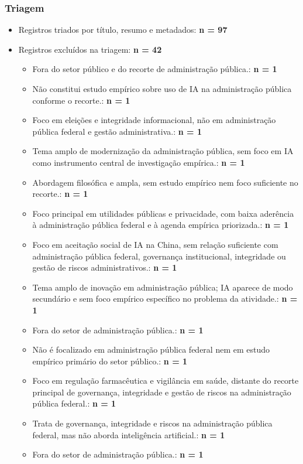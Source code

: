 \documentclass[12pt,a4paper]{article}
\begin{document}
\subsubsection{Triagem}
\label{sec:org6e35005}
\begin{itemize}
\item Registros triados por título, resumo e metadados: \textbf{n = 97}
\item Registros excluídos na triagem: \textbf{n = 42}
\begin{itemize}
\item Fora do setor público e do recorte de administração pública.: \textbf{n = 1}
\item Não constitui estudo empírico sobre uso de IA na administração pública conforme o recorte.: \textbf{n = 1}
\item Foco em eleições e integridade informacional, não em administração pública federal e gestão administrativa.: \textbf{n = 1}
\item Tema amplo de modernização da administração pública, sem foco em IA como instrumento central de investigação empírica.: \textbf{n = 1}
\item Abordagem filosófica e ampla, sem estudo empírico nem foco suficiente no recorte.: \textbf{n = 1}
\item Foco principal em utilidades públicas e privacidade, com baixa aderência à administração pública federal e à agenda empírica priorizada.: \textbf{n = 1}
\item Foco em aceitação social de IA na China, sem relação suficiente com administração pública federal, governança institucional, integridade ou gestão de riscos administrativos.: \textbf{n = 1}
\item Tema amplo de inovação em administração pública; IA aparece de modo secundário e sem foco empírico específico no problema da atividade.: \textbf{n = 1}
\item Fora do setor de administração pública.: \textbf{n = 1}
\item Não é focalizado em administração pública federal nem em estudo empírico primário do setor público.: \textbf{n = 1}
\item Foco em regulação farmacêutica e vigilância em saúde, distante do recorte principal de governança, integridade e gestão de riscos na administração pública federal.: \textbf{n = 1}
\item Trata de governança, integridade e riscos na administração pública federal, mas não aborda inteligência artificial.: \textbf{n = 1}
\item Fora do setor de administração pública.: \textbf{n = 1}

\end{itemize}
\end{itemize}
\end{document}
